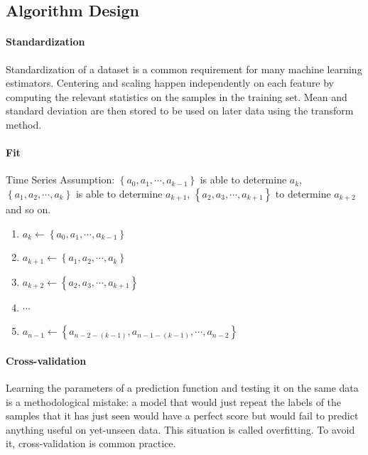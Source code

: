 \documentclass[a0,portrait]{a0poster}
\begin{document}
\begin{multicols}{3}
\subsection*{Algorithm Design}
\paragraph*{Standardization}
Standardization of a dataset is a common requirement for many machine learning estimators. Centering and scaling happen independently on each feature by computing the relevant statistics on the samples in the training set. Mean and standard deviation are then stored to be used on later data using the transform method.
\paragraph*{Fit}
Time Series Assumption: $\left\{a_0, a_1, \cdots, a_{k - 1}\right\}$ is able to determine $a_{k}$, $\left\{a_1, a_2, \cdots, a_{k}\right\}$ is able to determine $a_{k + 1}$, $\left\{a_2, a_3, \cdots, a_{k + 1}\right\}$ to determine $a_{k + 2}$ and so on.
\begin{enumerate}
\item $a_{k} \gets \left\{a_0, a_1, \cdots, a_{k - 1}\right\}$
\item $a_{k + 1} \gets \left\{a_1, a_2, \cdots, a_{k}\right\}$
\item $a_{k + 2} \gets \left\{a_2, a_3, \cdots, a_{k + 1}\right\}$
\item $\cdots$
\item $a_{n - 1} \gets \left\{a_{n - 2 - \left(k - 1\right)}, a_{n - 1 - \left(k - 1\right)}, \cdots, a_{n - 2}\right\}$
\end{enumerate}
\paragraph*{Cross-validation}
Learning the parameters of a prediction function and testing it on the same data is a methodological mistake: a model that would just repeat the labels of the samples that it has just seen would have a perfect score but would fail to predict anything useful on yet-unseen data. This situation is called overfitting. To avoid it, cross-validation is common practice.

\end{multicols}
\end{document}
